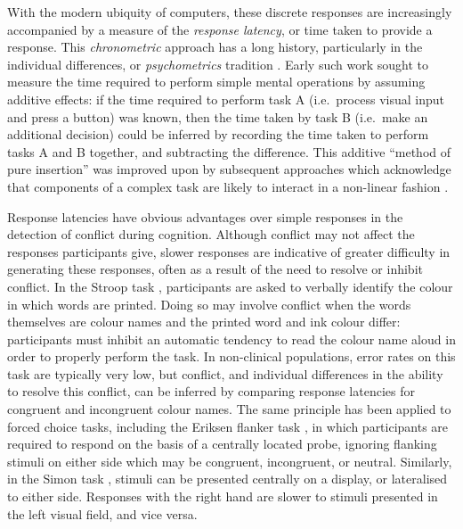 With the modern ubiquity of computers,
these discrete responses are increasingly accompanied by
a measure of the \emph{response latency}, or time taken
to provide a response.
This \emph{chronometric} approach has a long history,
particularly in the individual differences, or \emph{psychometrics} tradition 
\citep[see][for a review]{Posner1978,Meyer1988}.
Early such work \citep{Donders1868} sought to measure the time required
to perform simple mental operations by assuming additive effects:
if the time required to perform task A
(i.e.~process visual input and press a button) was known,
then the time taken by task B (i.e.~make an additional decision)
could be inferred by recording the time taken to perform tasks A and B together,
and subtracting the difference.
This additive ``method of pure insertion'' was improved upon
by subsequent approaches which acknowledge that components of a complex task
are likely to interact in a non-linear fashion \citep{Hick1952, Sternberg1969, Cooper1973}.

Response latencies have obvious advantages over simple responses
in the detection of conflict during cognition.
Although conflict may not affect the responses participants give,
slower responses are indicative of greater difficulty
in generating these responses,
often as a result of the need to resolve or inhibit conflict.
In the Stroop task \citep{Stroop1935},
participants are asked to verbally identify the colour in which words are printed.
Doing so may involve conflict when
the words themselves are colour names
and the printed word and ink colour differ:
participants must inhibit an automatic tendency
to read the colour name aloud
in order to properly perform the task.
In non-clinical populations,
error rates on this task are typically very low,
but conflict, and individual differences in the ability to resolve this conflict,
can be inferred by comparing response latencies
for congruent and incongruent colour names.
The same principle has been applied to forced choice tasks,
including the Eriksen flanker task \citep{Eriksen1974},
in which participants are required to respond
on the basis of a centrally located probe,
ignoring flanking stimuli on either side
which may be congruent, incongruent, or neutral.
Similarly, in the Simon task \citep{Simon1963},
stimuli can be presented centrally on a display,
or lateralised to either side.
Responses with the right hand are slower
to stimuli presented in the left visual field,
and vice versa.

